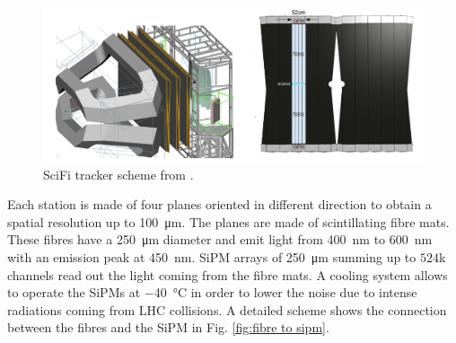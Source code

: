 \begin{figure}[htbp]
    \centering
    \includegraphics[width=\textwidth]{gfx/pictures/scifitracker.png}
    \caption{SciFi tracker scheme from \cite{TripplDevelopmentLHCb}.}
    \label{fig:scifitracker scheme}
\end{figure}
Each station is made of four planes oriented in different direction to obtain a spatial resolution up to \SI{100}{\micro m}. The planes are made of scintillating fibre mats. These fibres have a \SI{250}{\micro m} diameter and emit light from \SI{400}{\nano m} to \SI{600}{\nano m} with an emission peak at \SI{450}{\nano m}. SiPM arrays of \SI{250}{\micro m} summing up to $524$k channels  read out the light coming from the fibre mats. A cooling system allows to operate the SiPMs  at \SI{-40}{\celsius} in order to lower the noise due to intense radiations coming from LHC collisions. A detailed scheme shows the connection between the fibres and the SiPM in Fig. \ref{fig:fibre to sipm}.


